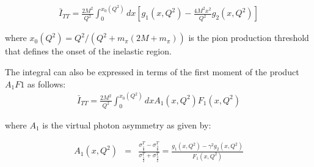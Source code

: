 \begin{eqnarray}
\label{eqGenGDH}
\bar{I}_{TT} = \frac{2M^2}{Q^2} \int_{0}^{x_0(Q^2)} dx [ g_1(x,Q^2) - \frac{4M^2x^2}{Q^2} g_2(x,Q^2) ]
\end{eqnarray}

where $x_0(Q^2) = Q^2/(Q^2 + m_{\pi}(2M+m_{\pi}))$ is the pion production threshold that defines the onset of the inelastic region.

The integral can also be expressed in terms of the first moment of the product $A_1F1$ as follows:
\begin{eqnarray}
\label{eqGenGDHaf}
\bar{I}_{TT} = \frac{2M^2}{Q^2} \int_{0}^{x_0(Q^2)} dx A_1(x,Q^2)F_1(x,Q^2)
\end{eqnarray}

where $A_1$ is the virtual photon asymmetry as given by:

\begin{eqnarray}
\label{vPhAsym}
A_1 (x,Q^2) &=&  \frac{\sigma^T_{ \frac{1}{2} } - \sigma^T_{ \frac{3}{2} } }{ \sigma^T_{ \frac{1}{2} } + \sigma^T_{ \frac{3}{2} }  }  
=  \frac{g_1(x,Q^2) - \gamma^2 g_2(x,Q^2)}{F_1(x,Q^2)}         \\
\end{eqnarray}


\begin{comment}
Fig. \ref{modelItt} shows a \chipts prediction along with the integral calculated from the model used in the EG4 data analysis covered by this note (see below). As is evident from the figure, the limiting value of the integral as \qsqs goes to zero is $\bar{I}_{TT}(0)=-1.5897$

\begin{figure}[h]%
  \leavevmode \texttt{[image: TexmakerMyFinTh/Chap2Theory/Figures/integralsModelsDataNoEG4IttLowQ2.png]} 
  \caption[Predictions for $\bar{I}^d_{TT}$]{A \chipts theoretical predictions for $\bar{I}^d_{TT}$ along with the integral calculated from the model used in the simulation for the data analysis.}
  \label{modelItt}  
\end{figure}
\end{comment}

